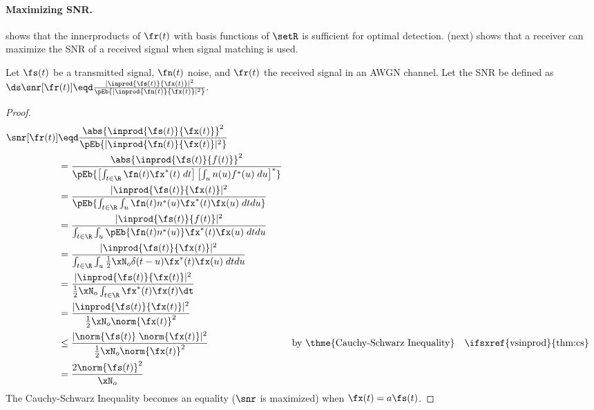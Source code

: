 \paragraph{Maximizing SNR.}
 shows that the innerproducts of $\fr(t)$ with
basis functions of $\setR$ is sufficient for optimal detection.
 (next) shows that a receiver can
maximize the SNR of a received signal when signal matching is used.

\begin{theorem}
\label{thm:mf_maxSNR}
Let $\fs(t)$ be a transmitted signal, $\fn(t)$ noise, and $\fr(t)$ the received signal
in an AWGN channel.
Let the  SNR be defined as
\\\indentx$\ds
      \snr[\fr(t)] \eqd \frac{|\inprod{\fs(t)}{\fx(t)}|^2}
                            {\pEb{|\inprod{\fn(t)}{\fx(t)}|^2}}.
          $
\end{theorem}

\begin{proof}
\begin{align*}
   \snr[\fr(t)]
     &\eqd \frac{\abs{\inprod{\fs(t)}{\fx(t)}}^2}
                {\pEb{|\inprod{\fn(t)}{\fx(t)}|^2}}
   \\&=    \frac{\abs{\inprod{\fs(t)}{f(t)}}^2}
                {\pEb{\left[\int_{t\in\R} \fn(t)\fx^\ast(t)\;dt\right]
                      \left[\int_u n(u)f^\ast(u)\;du\right]^\ast}
                }
   \\&=    \frac{|\inprod{\fs(t)}{\fx(t)}|^2}
                {\pEb{\int_{t\in\R} \int_u \fn(t)n^\ast(u)\fx^\ast(t)\fx(u)\;dtdu}}
   \\&=    \frac{|\inprod{\fs(t)}{f(t)}|^2}
                {\int_{t\in\R} \int_u \pEb{\fn(t)n^\ast(u)}\fx^\ast(t)\fx(u)\;dtdu}
   \\&=    \frac{|\inprod{\fs(t)}{\fx(t)}|^2}
                {\int_{t\in\R} \int_u \frac{1}{2}\xN_o\delta(t-u) \fx^\ast(t)\fx(u)\;dtdu}
   \\&=    \frac{|\inprod{\fs(t)}{\fx(t)}|^2}
                {\frac{1}{2}\xN_o \int_{t\in\R} \fx^\ast(t)\fx(t)\dt}
   \\&=    \frac{|\inprod{\fs(t)}{\fx(t)}|^2}
                {\frac{1}{2}\xN_o \norm{\fx(t)}^2}
   \\&\le  \frac{|\norm{\fs(t)}\;\norm{\fx(t)}|^2}
                {\frac{1}{2}\xN_o \norm{\fx(t)}^2}
     &&    \text{by \thme{Cauchy-Schwarz Inequality}}
     &&    \text{\ifsxref{vsinprod}{thm:cs}}
   \\&=    \frac{2\norm{\fs(t)}^2}
                {\xN_o }
\end{align*}
The Cauchy-Schwarz Inequality becomes an equality
($\snr$ is maximized) when $\fx(t)=a\fs(t)$.
\end{proof}

